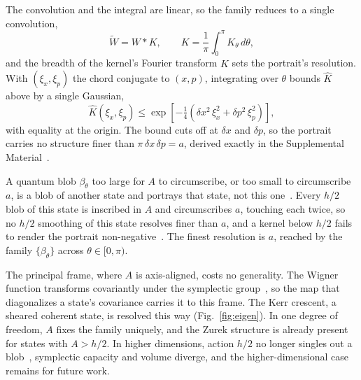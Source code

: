 \documentclass[aps,prl,reprint,amsmath,amssymb,floatfix,nofootinbib]{revtex4-2}
\begin{document}
The convolution and the integral are linear, so the family reduces to a single convolution,
\begin{equation}
\widetilde W = W * K, \qquad K = \frac{1}{\pi}\int_0^\pi K_\theta\,d\theta,
\label{eq:Kquorum}
\end{equation}
and the breadth of the kernel's Fourier transform $\widehat K$ sets the portrait's resolution. With $(\xi_x,\xi_p)$ the chord conjugate to $(x,p)$, integrating over $\theta$ bounds $\widehat K$ above by a single Gaussian,
\begin{equation}
\widehat{K}(\xi_x,\xi_p) \le \exp\!\left[ -\tfrac14\!\left( \delta x^{2}\,\xi_x^{2} + \delta p^{2}\,\xi_p^{2} \right) \right],
\label{eq:transfer}
\end{equation}
with equality at the origin. The bound cuts off at $\delta x$ and $\delta p$, so the portrait carries no structure finer than $\pi\,\delta x\,\delta p = a$, derived exactly in the Supplemental Material~\cite{zenododeposit}.

A quantum blob $\beta_\theta$ too large for $A$ to circumscribe, or too
small to circumscribe $a$, is a blob of another state and
portrays that state, not this one~\cite{degosson2013qblobs,
degosson2022polar}. Every $h/2$ blob of this state is inscribed in $A$
and circumscribes $a$, touching each twice, so no $h/2$ smoothing of this
state resolves finer than $a$, and a kernel below $h/2$ fails to render
the portrait non-negative~\cite{cartwright1976,degosson2005bullsci}.
The finest resolution is $a$, reached by the family $\{\beta_\theta\}$
across $\theta \in [0,\pi)$.

The principal frame, where $A$ is axis-aligned, costs no generality. The Wigner function transforms covariantly under the symplectic group~\cite{cordero2018}, so the map that diagonalizes a state's covariance carries it to this frame. The Kerr crescent, a sheared coherent state, is resolved this way (Fig.~\ref{fig:eigen}). In one degree of freedom, $A$ fixes the family uniquely, and the Zurek structure is already present for states with $A > h/2$. In higher dimensions, action $h/2$ no longer singles out a blob~\cite{degosson2013qblobs}, symplectic capacity and volume diverge, and the higher-dimensional case remains for future work.
\end{document}
